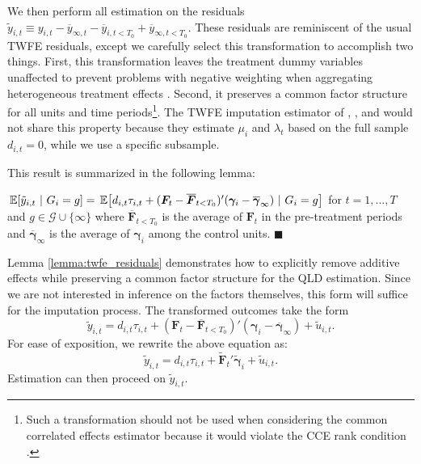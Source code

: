 \documentclass[12pt]{article}
\begin{document}
We then perform all estimation on the residuals $\tilde{y}_{i,t} \equiv y_{i,t} - \overline{y}_{\infty, t} - \overline{y}_{i,t < T_0} + \overline{y}_{\infty, t < T_0}$. These residuals are reminiscent of the usual TWFE residuals, except we carefully select this transformation to accomplish two things. First, this transformation leaves the treatment dummy variables unaffected to prevent problems with negative weighting when aggregating heterogeneous treatment effects \citep{Goodman-Bacon_2021,Borusyak_Jaravel_Spiess_2021}. Second, it preserves a common factor structure for all units and time periods\footnote{Such a transformation should not be used when considering the common correlated effects estimator because it would violate the CCE rank condition \citep{Brown_Butts_Westerlund_2023}.}. The TWFE imputation estimator of \citet{Gardner_2021}, \citet{Wooldridge_2021}, and \citet{Borusyak_Jaravel_Spiess_2021} would not share this property because they estimate $\mu_i$ and $\lambda_t$ based on the full sample $d_{i,t} = 0$, while we use a specific subsample.

This result is summarized in the following lemma:
\begin{lemma}\label{lemma:twfe_residuals}
  $\expec{\tilde{y}_{i,t}}{G_i = g} = \expec{d_{i,t}\tau_{i,t} + (\bm{F}_t - \overline{\bm{F}}_{t < T_0})' (\bm \gamma_i - \overline{\bm \gamma}_{\infty}) }{G_i = g}$ for $t = 1,...,T$ and $g \in \mathcal{G} \cup \{ \infty \}$ where $\overline{\bm{F}}_{t < T_0}$ is the average of $\bm{F}_t$ in the pre-treatment periods and $\overline{\bm\gamma}_\infty$ is the average of $\bm \gamma_i$ among the control units. $\blacksquare$
\end{lemma}

Lemma \ref{lemma:twfe_residuals} demonstrates how to explicitly remove additive effects while preserving a common factor structure for the QLD estimation. Since we are not interested in inference on the factors themselves, this form will suffice for the imputation process. The transformed outcomes take the form
\begin{equation}
  \tilde{y}_{i,t} = d_{i,t} \tau_{i,t} + (\bm{F}_t - \overline{\bm{F}}_{t < T_0})' (\bm \gamma_i - \overline{\bm \gamma}_\infty) + \tilde{u}_{i,t}.
\end{equation}
For ease of exposition, we rewrite the above equation as:
\begin{equation}
  \tilde{y}_{i,t} = d_{i,t} \tau_{i,t} + \tilde{\bm{F}}_t' \tilde{\bm \gamma}_i + \tilde{u}_{i,t}.
\end{equation}
Estimation can then proceed on $\tilde{y}_{i,t}$.
\end{document}
